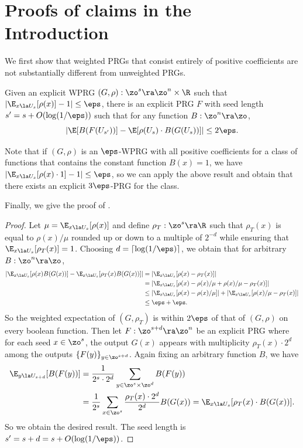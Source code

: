 \section{Proofs of claims in the Introduction}\label{app:intro} %
We first show that weighted PRGs that consist entirely of positive coefficients are not substantially different %
from
%
unweighted PRGs.
\begin{proposition}\label{app:prop:unweight}
    Given an explicit WPRG $(G,\rho):\zo^s\ra\zo^n\times \R$
    such that $|\E_{x\la U_s}[\rho(x)]-1|\leq  \eps$, there is an explicit PRG $F$ with seed length $s'=s+O(\log(1/\eps))$ such that for any function $B:\zo^n\ra\zo$, \[|\E[B(F(U_{s'}))] - \E[\rho(U_s)\cdot B(G(U_s))] |\leq 2\eps.\]
\end{proposition}
Note that if $(G,\rho)$ is an $\eps$-WPRG with all positive coefficients for a class of functions that contains the constant function $B(x)=1$, we have $|\E_{x\la U_s}[\rho(x)\cdot 1]-1|\leq\eps$, so we can apply the above result and obtain that there exists an explicit $3\eps$-PRG for the class.

Finally, we give the proof of .
\begin{proof}
    Let $\mu=\E_{x\la U_s}[\rho(x)]$ and define $\rho_T:\zo^s\ra\R$ such that $\rho_T(x)$ is equal to $\rho(x)/\mu$ rounded up or down to a multiple of $2^{-d}$ while ensuring that $\E_{x\la U_s}[\rho_T(x)]=1$. Choosing $d=\lceil\log(1/\eps)\rceil$, we obtain that for arbitrary $B:\zo^n\ra\zo$,
    \begin{align*}
        \left|\E_{x\la U_s}[\rho(x)B(G(x))] -\E_{x\la U_s}[\rho_T(x)B(G(x))]\right|  &= \left|\E_{x\la U_s}[\rho(x) - \rho_T(x)]\right|\\
        &= \left|\E_{x\la U_s}[\rho(x) -\rho(x)/\mu+\rho(x)/\mu- \rho_T(x)] \right|\\
        &\leq \left|\E_{x\la U_s}[\rho(x) -\rho(x)/\mu]\right|+\left|\E_{x\la U_s}[\rho(x)/\mu- \rho_T(x)] \right|\\
        &\leq \eps+\eps.
    \end{align*}
    So the weighted expectation of $(G,\rho_T)$ is within $2\eps$ of that of $(G,\rho)$ on every boolean function. Then let $F:\zo^{s+d}\ra\zo^n$ be an explicit PRG where for each seed $x\in \zo^s$, the output $G(x)$ appears with multiplicity $\rho_T(x)\cdot 2^d$ among the outputs $\{F(y)\}_{y\in \zo^{s+d}}$. Again fixing an arbitrary function $B$, we have
%
%
\begin{align*}
 \E_{y\la U_{s+d}}[B(F(y))] &= \frac{1}{2^s\cdot 2^d}\sum_{y\in \zo^s\times\zo^d}B(F(y))\\
 &=\frac{1}{2^s}\sum_{x\in \zo^s}\frac{\rho_T(x)\cdot 2^d}{2^d}B(G(x))
        =\E_{x\la U_s}[\rho_T(x)\cdot B(G(x))].
\end{align*}
    So we obtain the desired result. The seed length is $s'=s+d=s+O(\log(1/\eps))$.
\end{proof}

